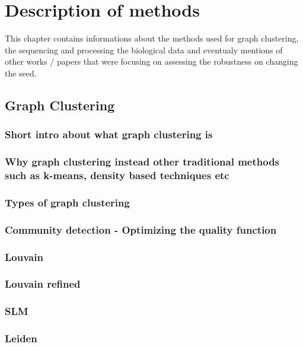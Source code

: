 \chapter{Description of methods}

This chapter contains informations about the methods used for graph clustering, the sequencing and processing the biological data and eventualy mentions of other works / papers that were focusing on assessing the robustness on changing the seed.

\section{Graph Clustering}

\subsection{Short intro about what graph clustering is}

\subsection{Why graph clustering instead other traditional methods such as k-means, density based techniques etc}

\subsection{Types of graph clustering}

\subsection{Community detection - Optimizing the quality function}

\subsection{Louvain}

\subsection{Louvain refined}
\subsection{SLM}
\subsection{Leiden}


